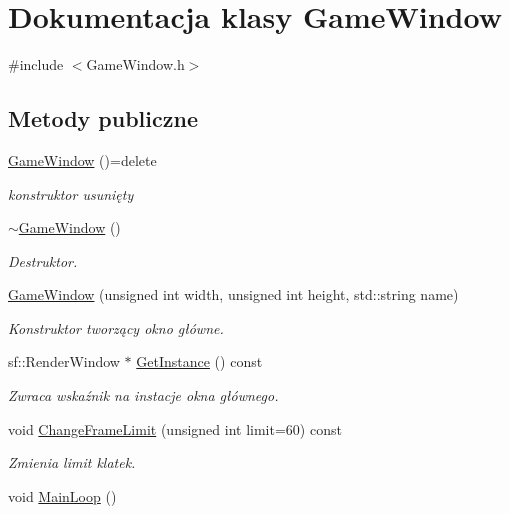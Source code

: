 \hypertarget{class_game_window}{}\section{Dokumentacja klasy Game\+Window}
\label{class_game_window}


{\ttfamily \#include $<$Game\+Window.\+h$>$}

\subsection*{Metody publiczne}
\begin{DoxyCompactItemize}
\item 
\mbox{\hyperlink{class_game_window_aeb8fe4d63cdd9e9d3e6fdcb35d15a37c}{Game\+Window}} ()=delete
\begin{DoxyCompactList}\small\item\em konstruktor usunięty \end{DoxyCompactList}\item 
\mbox{\hyperlink{class_game_window_a55b071c0390e45c064a160c1e6baaa08}{$\sim$\+Game\+Window}} ()
\begin{DoxyCompactList}\small\item\em Destruktor. \end{DoxyCompactList}\item 
\mbox{\hyperlink{class_game_window_a22da49d930c2fd26888b223049a9da18}{Game\+Window}} (unsigned int width, unsigned int height, std\+::string name)
\begin{DoxyCompactList}\small\item\em Konstruktor tworzący okno główne. \end{DoxyCompactList}\item 
sf\+::\+Render\+Window $\ast$ \mbox{\hyperlink{class_game_window_aa5ef8ededf54c333a5b19344b95220de}{Get\+Instance}} () const
\begin{DoxyCompactList}\small\item\em Zwraca wskaźnik na instacje okna głównego. \end{DoxyCompactList}\item 
void \mbox{\hyperlink{class_game_window_af2b8df98b008a25d8c64f67cd6f23f59}{Change\+Frame\+Limit}} (unsigned int limit=60) const
\begin{DoxyCompactList}\small\item\em Zmienia limit klatek. \end{DoxyCompactList}\item 
void \mbox{\hyperlink{class_game_window_a7dcdd3731da278a522c59a72ecee77b3}{Main\+Loop}} ()

\end{DoxyCompactItemize}
